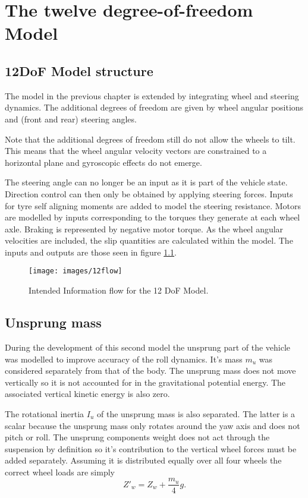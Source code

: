 \chapter{The twelve degree-of-freedom Model}
\label{chap:12dof}
\section{12DoF Model structure}
\label{sec:12dofconcept}
The model in the previous chapter is extended by integrating wheel and steering dynamics.
The additional degrees of freedom are given by wheel angular positions and (front and rear) steering angles.

Note that the additional degrees of freedom still do not allow the wheels to tilt. This means that the wheel angular velocity vectors are constrained to a horizontal plane and gyroscopic effects do not emerge.

The steering angle can no longer be an input as it is part of the vehicle state. Direction control can then only be obtained by applying steering forces.
Inputs for tyre self aligning moments are added to model the steering resistance.
Motors are modelled by inputs corresponding to the torques they generate at each wheel axle. Braking is represented by negative motor torque.
As the wheel angular velocities are included, the slip quantities are calculated within the model. The inputs and outputs are those seen in figure \ref{12flow}.
\begin{figure}[ht]
  \centering
  \texttt{[image: images/12flow]}
  \caption{Intended Information flow for the 12 DoF Model.}
  \label{12flow}
\end{figure}

\section{Unsprung mass}
\label{sec:umass}
During the development of this second model the unsprung part of the vehicle was modelled to improve accuracy of the roll dynamics. It's mass $m_u$ was considered separately from that of the body.
The unsprung mass does not move vertically so it is not accounted for in the gravitational potential energy. The associated vertical kinetic energy is also zero.

The rotational inertia $I_u$ of the unsprung mass is also separated. The latter is a scalar because the unsprung mass only rotates around the yaw axis and does not pitch or roll.
The unsprung components weight does not act through the suspension by definition so it's contribution to the vertical wheel forces must be added separately. Assuming it is distributed equally over all four wheels the correct wheel loads are simply
$$Z'_w = Z_w + \frac{m_u}{4}g.$$

